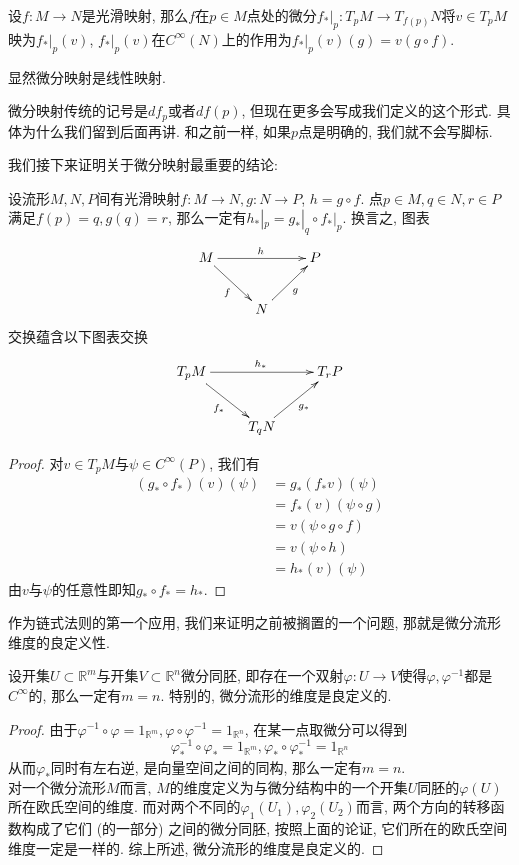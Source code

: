 \begin{defn}
    设$f:M\to N$是光滑映射, 那么$f$在$p\in M$点处的微分$f_*|_p:T_pM\to T_{f(p)}N$将$v\in T_pM$映为$f_*|_p(v)$, $f_*|_p(v)$在$C^\infty(N)$上的作用为$f_*|_p(v)(g)=v(g\circ f)$.
\end{defn}

显然微分映射是线性映射.

\begin{sym}
    微分映射传统的记号是$df_p$或者$df(p)$, 但现在更多会写成我们定义的这个形式.
    具体为什么我们留到后面再讲.
    和之前一样, 如果$p$点是明确的, 我们就不会写脚标.
\end{sym}

我们接下来证明关于微分映射最重要的结论:

\begin{thm}[链式法则]设流形$M,N,P$间有光滑映射$f:M\to N,g:N\to P$, $h=g\circ f$.
    点$p\in M,q\in N,r\in P$满足$f(p)=q,g(q)=r$, 那么一定有$h_*|_p=g_*|_q\circ f_*|_p$.
    换言之, 图表
    \[\xymatrix{
        M \ar[rr]^h \ar[dr]_f & & P\\
        & N \ar[ur]_g
    }\]
    交换蕴含以下图表交换
    \[\xymatrix{
        T_pM \ar[rr]^{h_*} \ar[dr]_{f_*} & & T_rP\\
        & T_qN \ar[ur]_{g_*}
    }\]
\end{thm}
\begin{proof}
    对$v\in T_pM$与$\psi\in C^\infty(P)$, 我们有
    \begin{align*}
        (g_*\circ f_*)(v)(\psi)&=g_*(f_*v)(\psi)\\
        &=f_*(v)(\psi\circ g)\\
        &=v(\psi\circ g\circ f)\\
        &=v(\psi\circ h)\\
        &=h_*(v)(\psi)
    \end{align*}
    由$v$与$\psi$的任意性即知$g_*\circ f_*=h_*$.
\end{proof}

作为链式法则的第一个应用, 我们来证明之前被搁置的一个问题, 那就是微分流形维度的良定义性.
\begin{prop}\label{def of dim}
    设开集$U\subset\mathbb{R}^m$与开集$V\subset\mathbb{R}^n$微分同胚, 即存在一个双射$\varphi:U\to V$使得$\varphi,\varphi^{-1}$都是$C^\infty$的, 那么一定有$m=n$.
    特别的, 微分流形的维度是良定义的.
\end{prop}
\begin{proof}
    由于$\varphi^{-1}\circ\varphi=1_{\mathbb{R}^m},\varphi\circ\varphi^{-1}=1_{\mathbb{R}^n}$, 在某一点取微分可以得到
    \[\varphi^{-1}_*\circ\varphi_*=1_{\mathbb{R}^m},\varphi_*\circ\varphi^{-1}_*=1_{\mathbb{R}^n}\]
    从而$\varphi_*$同时有左右逆, 是向量空间之间的同构, 那么一定有$m=n$.\\
    对一个微分流形$M$而言, $M$的维度定义为与微分结构中的一个开集$U$同胚的$\varphi(U)$所在欧氏空间的维度.
    而对两个不同的$\varphi_1(U_1),\varphi_2(U_2)$而言, 两个方向的转移函数构成了它们 (的一部分) 之间的微分同胚, 按照上面的论证, 它们所在的欧氏空间维度一定是一样的.
    综上所述, 微分流形的维度是良定义的.
\end{proof}

